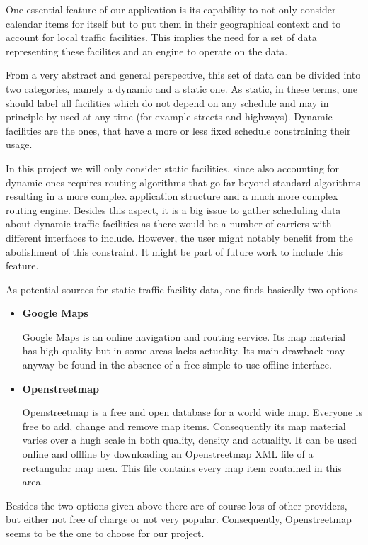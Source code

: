 One essential feature of our application is its capability to not only consider calendar items for itself but to put them in their geographical context and to account for local traffic facilities. This implies the need for a set of data representing these facilites and an engine to operate on the data.\newline

From a very abstract and general perspective, this set of data can be divided into two categories, namely a dynamic and a static one. As static, in these terms, one should label all facilities which do not depend on any schedule and may in principle by used at any time (for example streets and highways). Dynamic facilities are the ones, that have a more or less fixed schedule constraining their usage.\newline

In this project we will only consider static facilities, since also accounting for dynamic ones requires routing algorithms that go far beyond standard algorithms resulting in a more complex application structure and a much more complex routing engine. Besides this aspect, it is a big issue to gather scheduling data about dynamic traffic facilities as there would be a number of carriers with different interfaces to include. However, the user might notably benefit from the abolishment of this constraint. It might be part of future work to include this feature.\newline
 
As potential sources for static traffic facility data, one finds basically two options

\begin{itemize}
 
	\item \textbf{Google Maps}
	
		Google Maps is an online navigation and routing service. Its map material has high quality but in some areas lacks actuality. Its main drawback may anyway be found in the absence of a free simple-to-use offline interface. 
	
	\item \textbf{Openstreetmap}
	
		Openstreetmap is a free and open database for a world wide map. Everyone is free to add, change and remove map items. Consequently its map material varies over a hugh scale in both quality, density and actuality. It can be used online and offline by downloading an Openstreetmap XML file of a rectangular map area. This file contains every map item contained in this area.
  
\end{itemize} 

Besides the two options given above there are of course lots of other providers, but either not free of charge or not very popular. Consequently, Openstreetmap seems to be the one to choose for our project.
